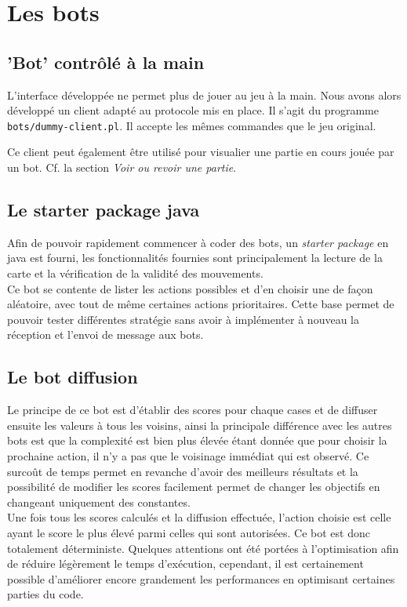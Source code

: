 \documentclass[10pt,a4paper]{report}
\begin{document}
\chapter{Les bots}

\section{'Bot' contrôlé à la main}

L'interface développée ne permet plus de jouer au jeu à la main. Nous avons
alors développé un client adapté au protocole mis en place. Il s'agit du
programme \verb!bots/dummy-client.pl!. Il accepte les mêmes commandes que le jeu
original.

Ce client peut également être utilisé pour visualier une partie en cours jouée
par un bot. Cf. la section \emph{Voir ou revoir une partie}.


\section{Le starter package java}
Afin de pouvoir rapidement commencer à coder des bots, un \emph{starter package}
en java est fourni, les fonctionnalités fournies sont principalement la lecture
de la carte et la vérification de la validité des mouvements.
\\
Ce bot se contente de lister les actions possibles et d'en choisir une de façon
aléatoire, avec tout de même certaines actions prioritaires. Cette base permet
de pouvoir tester différentes stratégie sans avoir à implémenter à nouveau la
réception et l'envoi de message aux bots.

\section{Le bot diffusion}
Le principe de ce bot est d'établir des scores pour chaque cases et de diffuser
ensuite les valeurs à tous les voisins, ainsi la principale différence avec les
autres bots est que la complexité est bien plus élevée étant donnée que pour
choisir la prochaine action, il n'y a pas que le voisinage immédiat qui est
observé. Ce surcoût de temps permet en revanche d'avoir des meilleurs résultats
et la possibilité de modifier les scores facilement permet de changer les
objectifs en changeant uniquement des constantes.
\\
Une fois tous les scores calculés et la diffusion effectuée, l'action choisie
est celle ayant le score le plus élevé parmi celles qui sont autorisées. Ce bot
est donc totalement déterministe. Quelques attentions ont été portées à
l'optimisation afin de réduire légèrement le temps d'exécution, cependant, il
est certainement possible d'améliorer encore grandement les performances en
optimisant certaines parties du code.
\end{document}
